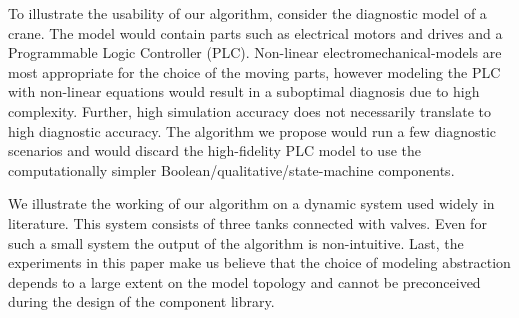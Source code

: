 \par
To illustrate the usability of our algorithm, consider the diagnostic
model of a crane. The model would contain parts such as electrical
motors and drives and a Programmable Logic Controller
(PLC). Non-linear electromechanical-models are most appropriate for
the choice of the moving parts, however modeling the PLC with
non-linear equations would result in a suboptimal diagnosis due to
high complexity. Further, high simulation accuracy does not
necessarily translate to high diagnostic accuracy. The algorithm we
propose would run a few diagnostic scenarios and would discard the
high-fidelity PLC model to use the computationally simpler
Boolean/qualitative/state-machine components.
\par
We illustrate the working of our algorithm on a dynamic system used
widely in literature. This system consists of three tanks connected
with valves. Even for such a small system the output of the algorithm
is non-intuitive. Last, the experiments in this paper make us believe
that the choice of modeling abstraction depends to a large extent on
the model topology and cannot be preconceived during the design of the
component library.
